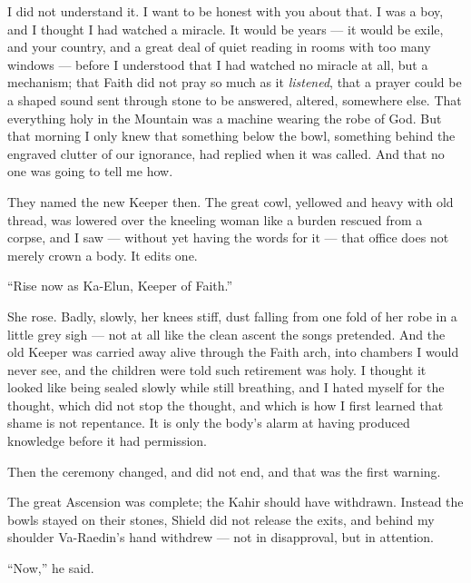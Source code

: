 I did not understand it. I want to be honest with you about that. I was a boy, and I thought I had watched a miracle. It would be years --- it would be exile, and your country, and a great deal of quiet reading in rooms with too many windows --- before I understood that I had watched no miracle at all, but a mechanism; that Faith did not pray so much as it \textit{listened}, that a prayer could be a shaped sound sent through stone to be answered, altered, somewhere else. That everything holy in the Mountain was a machine wearing the robe of God. But that morning I only knew that something below the bowl, something behind the engraved clutter of our ignorance, had replied when it was called. And that no one was going to tell me how.\par

They named the new Keeper then. The great cowl, yellowed and heavy with old thread, was lowered over the kneeling woman like a burden rescued from a corpse, and I saw --- without yet having the words for it --- that office does not merely crown a body. It edits one.\par

``Rise now as Ka-Elun, Keeper of Faith.''\par

She rose. Badly, slowly, her knees stiff, dust falling from one fold of her robe in a little grey sigh --- not at all like the clean ascent the songs pretended. And the old Keeper was carried away alive through the Faith arch, into chambers I would never see, and the children were told such retirement was holy. I thought it looked like being sealed slowly while still breathing, and I hated myself for the thought, which did not stop the thought, and which is how I first learned that shame is not repentance. It is only the body's alarm at having produced knowledge before it had permission.\par

\ornament

Then the ceremony changed, and did not end, and that was the first warning.\par

The great Ascension was complete; the Kahir should have withdrawn. Instead the bowls stayed on their stones, Shield did not release the exits, and behind my shoulder Va-Raedin's hand withdrew --- not in disapproval, but in attention.\par

``Now,'' he said.\par

